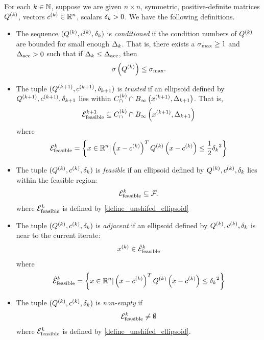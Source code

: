 \begin{definition}
\label{ellipsoids_notation_definitions}
For each $k \in \mathbb N$, suppose we are given $n\times n$, symmetric, positive-definite matrices ${Q^{(k)}}$, vectors ${c^{(k)}} \in \mathbb R^n$, scalars ${\delta_k} > 0$.
We have the following definitions.
\begin{itemize}
\item The sequence $({Q^{(k)}}, {c^{(k)}}, {\delta_k})$ is \emph{conditioned} if the condition numbers of ${Q^{(k)}}$ are bounded for small enough $\Delta_k$.
That is, there exists a ${\sigma_{\textrm{max}}} \ge 1$ and ${\Delta_{\textrm{acc}}} > 0$ such that if $\Delta_k \le {\Delta_{\textrm{acc}}}$, then
\begin{align}
{\sigma} \left({Q^{(k)}}\right) \le {\sigma_{\textrm{max}}}. \label{define_suitable_condition_numbers}
\end{align}
\item The tuple $({Q^{(k+1)}}, {c^{(k+1)}}, {\delta_{k+1}})$ is \emph{trusted} if an ellipsoid defined by ${Q^{(k+1)}}, {c^{(k+1)}}, {\delta_{k+1}}$ lies within $ {C^{(k)}_{\cap}} \cap { B_{\infty}\left({{x}^{(k+1)}}, \Delta_{k+1}\right) } $.
That is,
\begin{align}
{\mathcal E^{k+1}_{\textrm{feasible}}} \subseteq {C^{(k)}_{\cap}} \cap { B_{\infty}\left({{x}^{(k+1)}}, \Delta_{k+1}\right) }  \label{define_suitable_in_tr}
\end{align}
where
\begin{align}
{\mathcal E^k_{\textrm{feasible}}} = \left\{x \in \mathbb R^n | \left(x - {c^{(k)}} \right)^T {Q^{(k)}} \left(x - {c^{(k)}}\right) \le \frac 1 2 {{\delta_k}}^2 \right\} \label{define_unshifed_ellipsoid}
\end{align}
\item The tuple $({Q^{(k)}}, {c^{(k)}}, {\delta_k})$ is \emph{feasible} if an ellipsoid defined by ${Q^{(k)}}, {c^{(k)}}, {\delta_k}$ lies within the feasible region:
\begin{align}
{\mathcal E^k_{\textrm{feasible}}} \subseteq {\mathcal F}.
\end{align}
where ${\mathcal E^k_{\textrm{feasible}}}$ is defined by \cref{define_unshifed_ellipsoid}
\item The tuple $({Q^{(k)}}, {c^{(k)}}, {\delta_k})$ is \emph{adjacent} if an ellipsoid defined by ${Q^{(k)}}, {c^{(k)}}, {\delta_k}$ is near to the current iterate:
\begin{align}
x^{(k)} \in {{\mathcal {\hat E}_{\text{feasible}}}^k} \label{define_suitable_close_to_iterate}
\end{align}
where
\begin{align}
{{\mathcal {\hat E}_{\text{feasible}}}^k} = \left\{x \in \mathbb R^n | \left(x - {c^{(k)}}\right)^T {Q^{(k)}} \left(x - {c^{(k)}}\right) \le {{\delta_k}}^2 \right\} \label{define_scaledunshiftedellipsoid}
\end{align}
\item The tuple $({Q^{(k)}}, {c^{(k)}}, {\delta_k})$ is \emph{non-empty} if
\begin{align}
{\mathcal E^k_{\textrm{feasible}}} \ne \emptyset
\end{align}
where ${\mathcal E^k_{\textrm{feasible}}}$ is defined by \cref{define_unshifed_ellipsoid}.
\end{itemize}
\end{definition}

